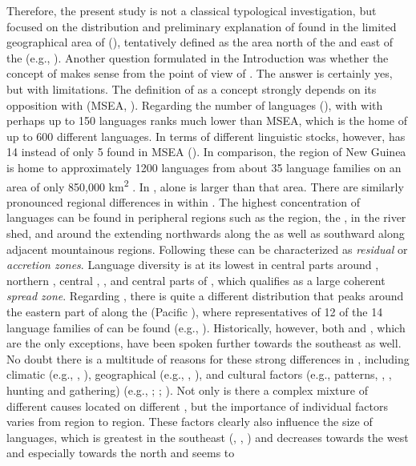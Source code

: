 \noindent Therefore, the present study is not a classical  typological investigation, but focused on the distribution and preliminary explanation of  found in the limited geographical area of  (), tentatively defined as the area north of the  and east of the  (e.g., \citealt{Chard1974}). Another question formulated in the Introduction was whether the concept of  makes sense from the point of view of . The answer is certainly yes, but with limitations. The definition of  as a concept strongly depends on its opposition with  (MSEA, \citealt{EnfieldComrie2015}). Regarding the number of languages (),  with with perhaps up to 150 languages ranks much lower than MSEA, which is the home of up to 600 different languages. In terms of different linguistic stocks, however,  has 14 instead of only 5 found in MSEA (). In comparison, the region of New Guinea is home to approximately 1200 languages from about 35 language families on an area of only 850,000 km\textsuperscript{2} \citep{Foley2000}. In ,  alone is larger than that area. There are similarly pronounced regional differences in  within . The highest concentration of languages can be found in peripheral regions such as the  region, the , in the  river shed, and around the  extending northwards along the  as well as southward along adjacent mountainous regions. Following \citet{Nichols1992,Nichols1997} these can be characterized as \textit{residual} or \textit{accretion zones}. Language diversity is at its lowest in central parts around , northern , central , , and central parts of , which qualifies as a large coherent \textit{spread zone}. Regarding , there is quite a different distribution that peaks around the eastern part of  along the  (Pacific ), where representatives of 12 of the 14 language families of  can be found (e.g., \citealt{Anderson2010}). Historically, however, both  and , which are the only exceptions, have been spoken further towards the southeast as well. No doubt there is a multitude of reasons for these strong differences in , including climatic (e.g., , ), geographical (e.g., , ), and cultural factors (e.g.,  patterns, , , hunting and gathering) (e.g., \citealt{Nichols1992}; \citealt{Nettle1999}; \citealt{AxelsenManrubia2014}). Not only is there a complex mixture of different causes located on different , but the importance of individual factors varies from region to region. These factors clearly also influence the size of languages, which is greatest in the southeast (, , ) and decreases towards the west and especially towards the north and seems to 